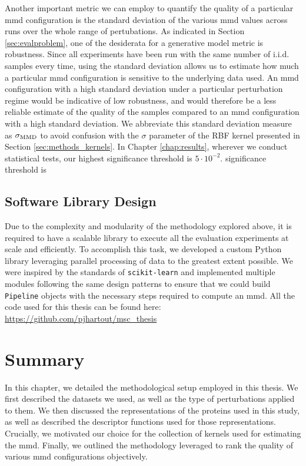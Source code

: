 Another important metric we can employ to quantify the quality of a particular
\acrshort{mmd} configuration is the standard deviation of the various
\acrshort{mmd} values across runs over the whole range of pertubations. As
indicated in Section \ref{sec:evalproblem}, one of the desiderata for a
generative model metric is robustness. Since all experiments have been run with
the same number of i.i.d. samples every time, using the standard deviation
allows us to estimate how much a particular \acrshort{mmd} configuration is sensitive
to the underlying data used. An \acrshort{mmd} configuration with a high standard
deviation under a particular perturbation regime would be indicative of low
robustness, and would therefore be a less reliable estimate of the quality of
the samples compared to an \acrshort{mmd} configuration with a high standard
deviation. We abbreviate this standard deviation measure as $\sigma_{\text{MMD}}$ to
avoid confusion with the $\sigma$ parameter of the RBF kernel presented in
Section \ref{sec:methods_kernels}. In Chapter \ref{chap:results}, wherever we
conduct statistical tests, our highest significance threshold is $5\cdot 10^{-2}$.
significance threshold is


\subsection{Software Library Design}


Due to the complexity and modularity of the methodology explored above, it is
required to have a scalable library to execute all the evaluation experiments at
scale and efficiently. To accomplish this task, we developed a custom Python
library leveraging parallel processing of data to the greatest extent possible.
We were inspired by the standards of \texttt{scikit-learn} and implemented
multiple modules following the same design patterns to ensure that we could
build \texttt{Pipeline} objects with the necessary steps required to compute an
\acrshort{mmd}. All the code used for this thesis can be found here:
\url{https://github.com/pjhartout/msc_thesis}


\section{Summary}

In this chapter, we detailed the methodological setup employed in this thesis.
We first described the datasets we used, as well as the type of perturbations
applied to them. We then discussed the representations of the proteins used in
this study, as well as described the descriptor functions used for those
representations. Crucially, we motivated our choice for the collection of
kernels used for estimating the \acrshort{mmd}. Finally, we outlined the
methodology leveraged to rank the quality of various \acrshort{mmd}
configurations objectively.
